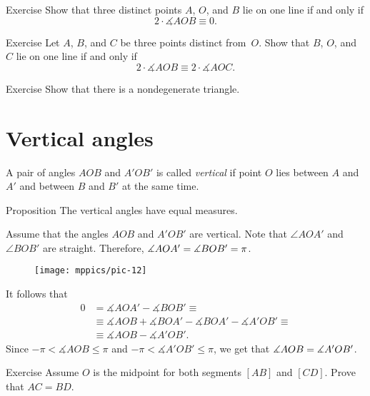\begin{thm}{Exercise}\label{ex:lineAOB}
Show that three distinct points $A$, $O$, and $B$ lie on one line if and only if 
$$2\cdot \measuredangle AOB\equiv 0.$$ 

\end{thm}

\begin{thm}{Exercise}\label{ex:ABCO-line}
Let $A$, $B$, and $C$ be three points distinct from~$O$.
Show that $B$, $O$, and $C$ lie on one line if and only if
$$2\cdot \measuredangle AOB\equiv 2\cdot \measuredangle AOC.$$ 

\end{thm}

\begin{thm}{Exercise}\label{ex:infinite-number-of-lines} 
Show that there is a nondegenerate triangle.
\end{thm}

\section{Vertical angles}

A pair of angles $AOB$ and $A'OB'$ 
is called \emph{vertical}
if point $O$ 
lies between $A$ and $A'$ 
and between $B$ and $B'$ at the same time.


\begin{thm}[\abs]{Proposition}\label{prop:vert}
The vertical angles have equal measures.
\end{thm}


Assume that the angles $AOB$ and $A'OB'$ are vertical.
Note that $\angle AOA'$ and $\angle BOB'$ are straight.
Therefore, $\measuredangle AOA'\z=\measuredangle BOB'=\pi$.

{

\begin{wrapfigure}[4]{o}{24mm}
\vskip-2mm
\centering
\texttt{[image: mppics/pic-12]}
\end{wrapfigure}

It follows that
\begin{align*}
0&=\measuredangle AOA'-\measuredangle BOB'\equiv
\\
&\equiv 
\measuredangle AOB+\measuredangle BOA'-\measuredangle BOA'-\measuredangle A'OB'
\equiv
\\
&\equiv\measuredangle AOB-\measuredangle A'OB'.
\end{align*}
Since $-\pi<\measuredangle AOB\le \pi$ and $-\pi<\measuredangle A'OB'\le \pi$, we get that $\measuredangle AOB\z=\measuredangle A'OB'$.
\qeds

}

\begin{thm}{Exercise}\label{ex:O-mid-AB+CD}
Assume $O$ 
is the midpoint for both segments 
$[A B]$ and $[C D]$.
Prove that $A C= B D$. 
\end{thm}
